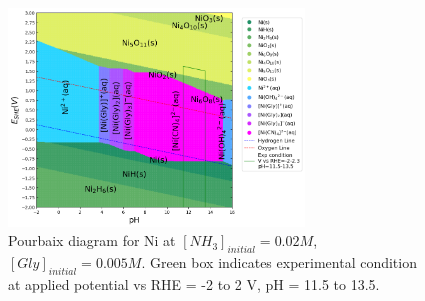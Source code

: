 \documentclass[journal=jacsat,manuscript=article,email=false]{achemso}
\begin{document}
\begin{figure}[htbp]
    \centering
    \includegraphics[width=0.7\textwidth]{Figures/pourbaix_diagrams/Ni-NH3-H2O_activity=1e-04_[NH3]=0.02M_[Gly]=0.005M_[CN]=0.0001.png}
    \caption{Pourbaix diagram for Ni at $[NH_3]_{initial}= 0.02M$, $[Gly]_{initial}=0.005M$. Green box indicates experimental condition at applied potential vs RHE = -2 to 2 V, pH = 11.5 to 13.5.}
    \label{fig:Ni_Pourbaix_NH3_Gly_SI}
\end{figure}
\end{document}
